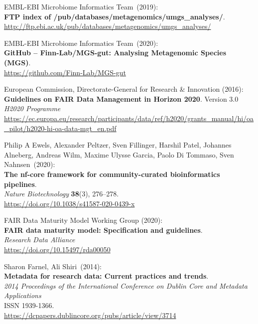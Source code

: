 \begin{thebibliography}{9}
EMBL-EBI Microbiome Informatics Team~(2019):\\
\textbf{FTP index of /pub/databases/metagenomics/umgs\_analyses/}.\\
\url{http://ftp.ebi.ac.uk/pub/databases/metagenomics/umgs_analyses/}

EMBL-EBI Microbiome Informatics Team~(2020):\\
\textbf{GitHub -- Finn-Lab/MGS-gut: Analysing Metagenomic Species (MGS)}.\\
\url{https://github.com/Finn-Lab/MGS-gut}

European Commission, Directorate-General for Research \& Innovation (2016):\\
\textbf{Guidelines on FAIR Data Management in Horizon 2020}. Version 3.0\\
\emph{H2020 Programme}\\
\url{https://ec.europa.eu/research/participants/data/ref/h2020/grants_manual/hi/oa_pilot/h2020-hi-oa-data-mgt_en.pdf}

Philip A Ewels, Alexander Peltzer, Sven Fillinger, Harshil
Patel, Johannes Alneberg, Andreas Wilm, Maxime Ulysse Garcia, Paolo Di
Tommaso, Sven Nahnsen~(2020):\\
\textbf{The nf-core framework for community-curated bioinformatics
pipelines}.\\
\emph{Nature Biotechnology} \textbf{38}(3), 276--278.\\
\url{https://doi.org/10.1038/s41587-020-0439-x}

FAIR Data Maturity Model Working Group (2020): \\
\textbf{FAIR data maturity model: Specification and guidelines}.\\
\emph{Research Data Alliance}\\
\url{https://doi.org/10.15497/rda00050}

Sharon Farnel, Ali Shiri~(2014):\\
\textbf{Metadata for research data: Current practices and trends}.\\
\emph{2014 Proceedings of the International Conference on Dublin Core
and Metadata Applications}\\
ISSN 1939-1366.\\
\url{https://dcpapers.dublincore.org/pubs/article/view/3714}


\end{thebibliography}
